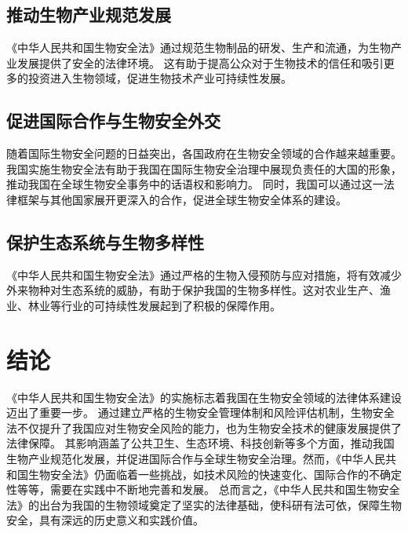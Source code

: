 \documentclass{article}
\begin{document}
\subsection{推动生物产业规范发展}
《中华人民共和国生物安全法》通过规范生物制品的研发、生产和流通，为生物产业发展提供了安全的法律环境。
这有助于提高公众对于生物技术的信任和吸引更多的投资进入生物领域，促进生物技术产业可持续性发展。
\subsection{促进国际合作与生物安全外交}
随着国际生物安全问题的日益突出，各国政府在生物安全领域的合作越来越重要。
我国实施生物安全法有助于我国在国际生物安全治理中展现负责任的大国的形象，推动我国在全球生物安全事务中的话语权和影响力。
同时，我国可以通过这一法律框架与其他国家展开更深入的合作，促进全球生物安全体系的建设。
\subsection{保护生态系统与生物多样性}
《中华人民共和国生物安全法》通过严格的生物入侵预防与应对措施，将有效减少外来物种对生态系统的威胁，有助于保护我国的生物多样性。这对农业生产、渔业、林业等行业的可持续性发展起到了积极的保障作用。

\section{结论}
《中华人民共和国生物安全法》的实施标志着我国在生物安全领域的法律体系建设迈出了重要一步。
通过建立严格的生物安全管理体制和风险评估机制，生物安全法不仅提升了我国应对生物安全风险的能力，也为生物安全技术的健康发展提供了法律保障。
其影响涵盖了公共卫生、生态环境、科技创新等多个方面，推动我国生物产业规范化发展，并促进国际合作与全球生物安全治理。然而，《中华人民共和国生物安全法》仍面临着一些挑战，如技术风险的快速变化、国际合作的不确定性等等，需要在实践中不断地完善和发展。
总而言之，《中华人民共和国生物安全法》的出台为我国的生物领域奠定了坚实的法律基础，使科研有法可依，保障生物安全，具有深远的历史意义和实践价值。~\cite{format}
\end{document}
